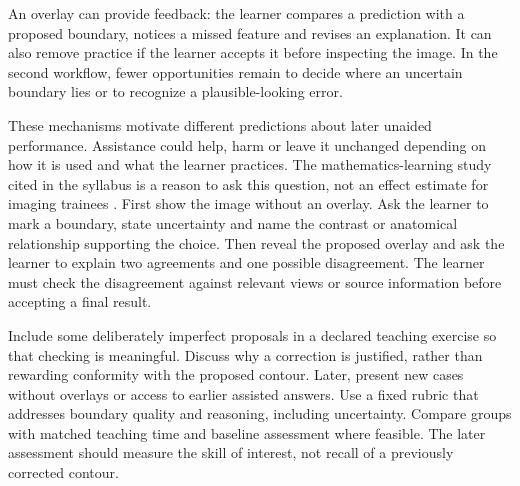\biomedicalanswer
{}
An overlay can provide feedback: the learner compares a prediction with a proposed boundary, notices a missed feature and revises an explanation. It can also remove practice if the learner accepts it before inspecting the image. In the second workflow, fewer opportunities remain to decide where an uncertain boundary lies or to recognize a plausible-looking error.

These mechanisms motivate different predictions about later unaided performance. Assistance could help, harm or leave it unchanged depending on how it is used and what the learner practices. The mathematics-learning study cited in the syllabus is a reason to ask this question, not an effect estimate for imaging trainees \citep{bastani2025learning}.
First show the image without an overlay. Ask the learner to mark a boundary, state uncertainty and name the contrast or anatomical relationship supporting the choice. Then reveal the proposed overlay and ask the learner to explain two agreements and one possible disagreement. The learner must check the disagreement against relevant views or source information before accepting a final result.

Include some deliberately imperfect proposals in a declared teaching exercise so that checking is meaningful. Discuss why a correction is justified, rather than rewarding conformity with the proposed contour.
Later, present new cases without overlays or access to earlier assisted answers. Use a fixed rubric that addresses boundary quality and reasoning, including uncertainty. Compare groups with matched teaching time and baseline assessment where feasible. The later assessment should measure the skill of interest, not recall of a previously corrected contour.

